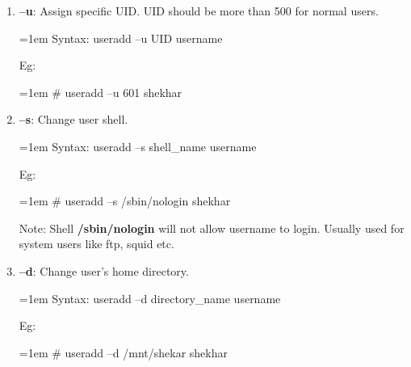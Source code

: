 \begin{flushleft}
\begin{enumerate}[label=(\alph*)]
		\newpage
		\item \textbf{–u}: Assign specific UID. UID should be more than 500 for normal users.
		\bigskip
		\begin{tcolorbox}[breakable,notitle,boxrule=0pt,colback=pink,colframe=pink]
			\color{black}
			\font=1em
			Syntax: useradd –u UID username
			\font=4pt
		\end{tcolorbox}
		Eg:
		\bigskip
		\begin{tcolorbox}[breakable,notitle,boxrule=-0pt,colback=black,colframe=black]
			\color{green}
			\font=1em
			\# useradd –u 601 shekhar
			\font=4pt
		\end{tcolorbox}
		
		
		\item \textbf{–s}: Change user shell.
		\bigskip
		\begin{tcolorbox}[breakable,notitle,boxrule=0pt,colback=pink,colframe=pink]
			\color{black}
			\font=1em
			Syntax: useradd –s shell\_name username
			\font=4pt
		\end{tcolorbox}
		Eg:
		\bigskip
		\begin{tcolorbox}[breakable,notitle,boxrule=-0pt,colback=black,colframe=black]
			\color{green}
			\font=1em
			\# useradd –s /sbin/nologin shekhar
			\font=4pt
		\end{tcolorbox}
		\bigskip
		\begin{tcolorbox}[breakable,notitle,boxrule=-0pt,colback=yellow,colframe=yellow]
			\color{black}
			Note: Shell \textbf{/sbin/nologin} will not allow username to login. Usually used for system users like ftp, squid etc.
		\end{tcolorbox}
		
		
		\item \textbf{–d}: Change user's home directory.
		\bigskip
		\begin{tcolorbox}[breakable,notitle,boxrule=0pt,colback=pink,colframe=pink]
			\color{black}
			\font=1em
			Syntax: useradd –d directory\_name username
			\font=4pt
		\end{tcolorbox}
		Eg:
		\bigskip
		\begin{tcolorbox}[breakable,notitle,boxrule=-0pt,colback=black,colframe=black]
			\color{green}
			\font=1em
			\# useradd –d /mnt/shekar shekhar 
			\font=4pt
		\end{tcolorbox}
	\end{enumerate}
	

\end{flushleft}
